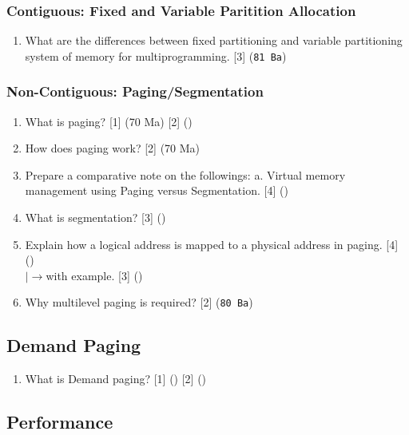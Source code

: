 \documentclass[12pt]{article}
\newcommand{\lb}{\\$\left|\rightarrow\right.$}
\begin{document}
		\subsubsection{Contiguous: Fixed and Variable Paritition Allocation}
			\begin{enumerate}
				\item What are the differences between fixed partitioning and variable partitioning system of memory for multiprogramming. \hfill [3] (\texttt{81 Ba})
			\end{enumerate}

		\subsubsection{Non-Contiguous: Paging/Segmentation}
			\begin{enumerate}
				\item What is paging? \hfill [1] (70 Ma) [2] ()

				\item How does paging work? \hfill [2] (70 Ma)

				\item Prepare a comparative note on the followings: a. Virtual memory management using Paging versus Segmentation. \hfill [4] ()

				\item What is segmentation? \hfill [3] ()
				
				\item Explain how a logical address is mapped to a physical address in paging. \hfill [4] ()
				\lb with example. [3] ()

				\item Why multilevel paging is required? \hfill [2] (\texttt{80 Ba})
			\end{enumerate}

	\subsection{Demand Paging}
		\begin{enumerate}
			\item What is Demand paging? \hfill [1] () [2] ()
		\end{enumerate}
	\subsection{Performance}
\end{document}
